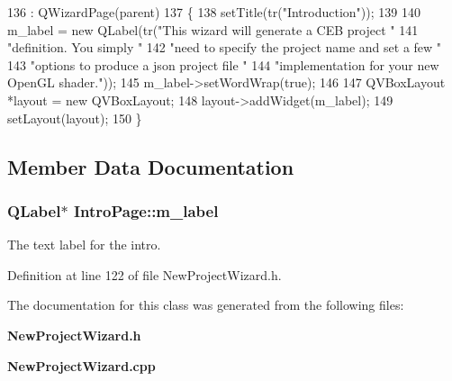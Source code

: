 \begin{DoxyCode}
136   : QWizardPage(parent)
137 \{
138   setTitle(tr(\textcolor{stringliteral}{"Introduction"}));
139 
140   m_label = \textcolor{keyword}{new} QLabel(tr(\textcolor{stringliteral}{"This wizard will generate a CEB project "}
141                           \textcolor{stringliteral}{"definition. You simply "}
142                           \textcolor{stringliteral}{"need to specify the project name and set a few "}
143                           \textcolor{stringliteral}{"options to produce a json project file "}
144                           \textcolor{stringliteral}{"implementation for your new OpenGL shader."}));
145   m_label->setWordWrap(\textcolor{keyword}{true});
146 
147   QVBoxLayout *layout = \textcolor{keyword}{new} QVBoxLayout;
148   layout->addWidget(m_label);
149   setLayout(layout);
150 \}
\end{DoxyCode}


\subsection{Member Data Documentation}
\subsubsection[{m\-\_\-label}]{\setlength{\rightskip}{0pt plus 5cm}Q\-Label$\ast$ Intro\-Page\-::m\-\_\-label\hspace{0.3cm}{\ttfamily [private]}}\label{class_intro_page_aac34d1db888c41e6f28c563049aaf071}


The text label for the intro. 



Definition at line 122 of file New\-Project\-Wizard.\-h.



The documentation for this class was generated from the following files\-:\begin{DoxyCompactItemize}
\item 
{\bf New\-Project\-Wizard.\-h}\item 
{\bf New\-Project\-Wizard.\-cpp}\end{DoxyCompactItemize}
